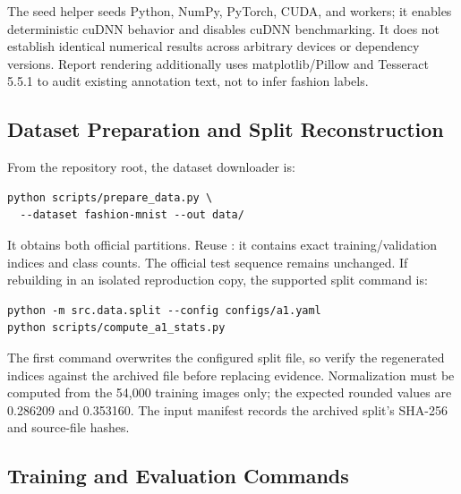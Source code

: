 The seed helper seeds Python, NumPy, PyTorch, CUDA, and workers; it enables deterministic cuDNN behavior and disables cuDNN benchmarking. It does not establish identical numerical results across arbitrary devices or dependency versions. Report rendering additionally uses matplotlib/Pillow and Tesseract 5.5.1 to audit existing annotation text, not to infer fashion labels.

\subsection{Dataset Preparation and Split Reconstruction}

From the repository root, the dataset downloader is:
\begin{verbatim}
python scripts/prepare_data.py \
  --dataset fashion-mnist --out data/
\end{verbatim}
It obtains both official partitions. Reuse : it contains exact training/validation indices and class counts. The official test sequence remains unchanged. If rebuilding in an isolated reproduction copy, the supported split command is:
\begin{verbatim}
python -m src.data.split --config configs/a1.yaml
python scripts/compute_a1_stats.py
\end{verbatim}
The first command overwrites the configured split file, so verify the regenerated indices against the archived file before replacing evidence. Normalization must be computed from the 54,000 training images only; the expected rounded values are 0.286209 and 0.353160. The input manifest records the archived split's SHA-256 and source-file hashes.

\subsection{Training and Evaluation Commands}

